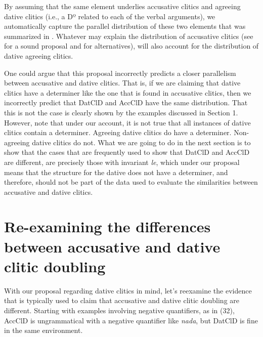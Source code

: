 \documentclass[output=paper,colorlinks,citecolor=brown,
]{langscibook}
\begin{document}
By assuming that the same element underlies accusative clitics and agreeing dative clitics (i.e., a Dº related to each of the verbal arguments), we automatically capture the parallel distribution of these two elements that was summarized in . Whatever may explain the distribution of accusative clitics (see \citealt{leonetti2008} for a sound proposal and for alternatives), will also account for the distribution of dative agreeing clitics. 

One could argue that this proposal incorrectly predicts a closer parallelism between accusative and dative clitics. That is, if we are claiming that dative clitics have a determiner like the one that is found in accusative clitics, then we incorrectly predict that DatClD and AccClD have the same distribution. That this is not the case is clearly shown by the examples discussed in Section 1. However, note that under our account, it is not true that all instances of dative clitics contain a determiner. Agreeing dative clitics do have a determiner. Non-agreeing dative clitics do not. What we are going to do in the next section is to show that the cases that are frequently used to show that DatClD and AccClD are different, are precisely those with invariant \textit{le}, which under our proposal means that the structure for the dative does not have a determiner, and therefore, should not be part of the data used to evaluate the similarities between accusative and dative clitics. 


\section{Re-examining the differences between accusative and dative clitic doubling}

With our proposal regarding dative clitics in mind, let’s reexamine the evidence that is typically used to claim that accusative and dative clitic doubling are different. Starting with examples involving negative quantifiers, as in (32), AccClD is ungrammatical with a negative quantifier like \textit{nada}, but DatClD is fine in the same environment.


\end{document}
